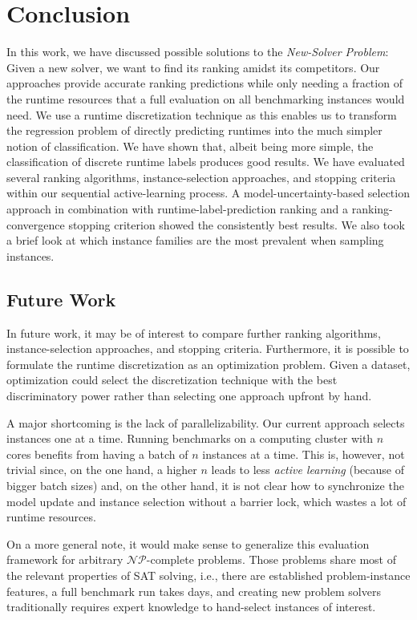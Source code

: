 \documentclass[runningheads]{llncs}
\begin{document}
\section{Conclusion}
In this work, we have discussed possible solutions to the \emph{New-Solver Problem}:
Given a new solver, we want to find its ranking amidst its competitors.
Our approaches provide accurate ranking predictions while only needing a fraction of the runtime resources that a full evaluation on all benchmarking instances would need.
We use a runtime discretization technique as this enables us to transform the regression problem of directly predicting runtimes into the much simpler notion of classification.
We have shown that, albeit being more simple, the classification of discrete runtime labels produces good results.
We have evaluated several ranking algorithms, instance-selection approaches, and stopping criteria within our sequential active-learning process.
A model-uncertainty-based selection approach in combination with runtime-label-prediction ranking and a ranking-convergence stopping criterion showed the consistently best results.
We also took a brief look at which instance families are the most prevalent when sampling instances.

\subsection{Future Work}
In future work, it may be of interest to compare further ranking algorithms, instance-selection approaches, and stopping criteria.
Furthermore, it is possible to formulate the runtime discretization as an optimization problem.
Given a dataset, optimization could select the discretization technique with the best discriminatory power rather than selecting one approach upfront by hand.

A major shortcoming is the lack of parallelizability.
Our current approach selects instances one at a time.
Running benchmarks on a computing cluster with $n$ cores benefits from having a batch of $n$ instances at a time.
This is, however, not trivial since, on the one hand, a higher $n$ leads to less \emph{active learning} (because of bigger batch sizes) and, on the other hand, it is not clear how to synchronize the model update and instance selection without a barrier lock, which wastes a lot of runtime resources.

On a more general note, it would make sense to generalize this evaluation framework for arbitrary $\mathcal{NP}$-complete problems.
Those problems share most of the relevant properties of SAT solving, i.e., there are established problem-instance features, a full benchmark run takes days, and creating new problem solvers traditionally requires expert knowledge to hand-select instances of interest.


%
%


\end{document}
